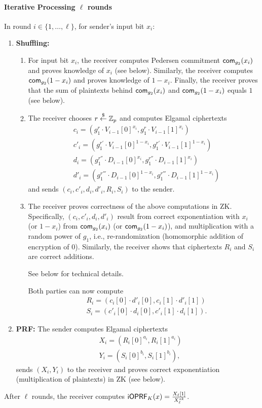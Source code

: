 \documentclass{article}
\begin{document}
\paragraph{Iterative Processing $\ell$ rounds}
In round $i\in\{1,\ldots,\ell\}$, for sender's input bit $x_i$:
\begin{enumerate}
\item {\bf Shuffling:}
\begin{enumerate}
\item   For input bit $x_i$, the receiver computes
  Pedersen commitment $\mathsf{com}_{g_2}(x_i)$ and proves knowledge of $x_i$
  (see below). Similarly, the receiver computes $\mathsf{com}_{g_2}(1-x_i)$
  and proves knowledge of $1-x_i$. Finally, the receiver proves that
  the sum of plaintexts behind $\mathsf{com}_{g_2}(x_i)$ and
  $\mathsf{com}_{g_2}(1-x_i)$ equals $1$ (see below).


\item  The receiver chooses $r\stackrel{\$}{\leftarrow}\mathbb{Z}_p$ and computes Elgamal ciphertexts
  \begin{align*}
    &c_i=(g_1^r\cdot{}V_{i-1}[0]^{x_i},g_1^{r}\cdot{}V_{i-1}[1]^{x_i})
    \\&c'_i=(g_1^{r'}\cdot{}V_{i-1}[0]^{1-x_i},g_1^{r'}\cdot{}V_{i-1}[1]^{1-x_i})
    \\&d_i=(g_1^{r''}\cdot{}D_{i-1}[0]^{x_i},g_1^{r''}\cdot{}D_{i-1}[1]^{x_i})
    \\&d'_i=(g_1^{r'''}\cdot{}D_{i-1}[0]^{1-x_i},g_1^{r'''}\cdot{}D_{i-1}[1]^{1-x_i})%
  \end{align*}
  and sends $(c_i,c'_i,d_i,d'_i,R_i,S_i)$ to the sender.

  \item The receiver proves correctness of the above computations in
    ZK. Specifically, $(c_i,c'_i,d_i,d'_i)$ result from correct
    exponentiation with $x_i$ (or $1-x_i$) from $\mathsf{com}_{g_2}(x_i)$ (or
    $\mathsf{com}_{g_2}(1-x_i)$), and multiplication with a random power of
    $g_1$, i.e., re-randomization (homomorphic addition of encryption
    of $0$). Similarly, the receiver shows that ciphertexts $R_i$ and
    $S_i$ are correct additions.

    See below for technical details.

    Both parties can now compute
    \begin{align*}&R_i=(c_i[0]\cdot{}d'_i[0],c_i[1]\cdot{}d'_i[1])
    \\&S_i=(c'_i[0]\cdot{}d_i[0],c'_i[1]\cdot{}d_i[1]).
    \end{align*}
   
  \end{enumerate}

\item {\bf PRF:} The sender computes Elgamal ciphertexts
  \begin{align*}
&X_i=(R_i[0]^{a_i},R_i[1]^{a_i})
\\&Y_i=(S_i[0]^{b_i},S_i[1]^{b_i}),
  \end{align*}
sends $(X_i,Y_i)$ to the receiver and proves correct exponentiation
(multiplication of plaintexts) in ZK (see below).
\end{enumerate}
After $\ell$ rounds, the receiver computes
$\mathsf{i}\mathsf{OPRF}_K(x)=\frac{X_\ell[1]}{X_{\ell}^{sk}}$.
\end{document}
